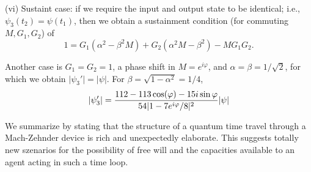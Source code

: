 (vi) Sustaint case:
if we require the input and output state to be identical; i.e.,
$\psi_3(t_2)=\psi (t_1)$,
then we obtain a sustainment condition (for commuting $M,G_1,G_2$) of
\begin{equation}
\label{eq38}
1=
G_1(\alpha^2-\beta^2 M)+
G_2(\alpha^2M-\beta^2 )- MG_1G_2.
\end{equation}

\noindent
Another  case is $G_1=G_2=1$, a phase shift in $M=e^{i\varphi}$, and
$\alpha=\beta=1/\sqrt{2}$, for which we obtain
$\vert \psi_3'\vert=\vert \psi \vert$. For $\beta=\sqrt{1-\alpha^2}=1/4$,
\begin{equation}
\label{eq39}
\vert \psi_3'\vert=
{112-113\cos(\varphi)-15i\sin{\varphi}\over
54\vert 1-7e^{i\varphi}/8\vert^2}
\vert \psi \vert
\end{equation}


We summarize by stating that the structure of a quantum time travel through a
Mach-Zehnder device is rich and unexpectedly elaborate.
This suggests totally new szenarios for the possibility of free will
and the capacities available to an agent acting in such a time loop.




%


